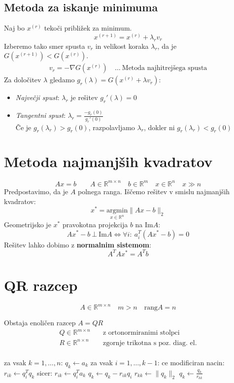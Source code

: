 \begin{multicols}{4}
\subsection{Metoda za iskanje minimuma}
Naj bo $x^{(r)}$ tekoči približek za minimum.
\[ x^{(r+1)} = x^{(r)} + \lambda_r v_r\]
Izberemo tako smer spusta $v_r$ in velikost koraka $\lambda_r$, da je $G(x^{(r+1)}) < G(x^{(r)})$.
\begin{align*}
	v_r = - \nabla G(x^{(r)}) & \ \dots \ \text{Metoda najhitrejšega spusta}
\end{align*} 
Za določitev $\lambda$ gledamo $g_r(\lambda) = G(x^{(r)} + \lambda v_r)$:
\begin{itemize}
	\item \textit{Največji spust}: $\lambda_r$ je rešitev $g_r'(\lambda) = 0$
	\item \textit{Tangentni spust}: $\lambda_r = \frac{-g_r(0)}{g_r'(0)}$ \\
	Če je $g_r(\lambda_r) > g_r(0)$, razpolavljamo $\lambda_r$, dokler ni $g_r(\lambda_r) < g_r(0)$
\end{itemize}

\section{Metoda najmanjših kvadratov}
\[ A x = b \qquad A \in \mathbb{R}^{m \times n} \quad b \in \mathbb{R}^m \quad x \in \mathbb{R}^n \quad x \gg n\]
Predpostavimo, da je $A$ polnega ranga.
Iščemo rešitev v smislu najmanjših kvadratov:
\[ x^* = \underset{x \in \mathbb{R}^n}{\mathrm{argmin}} \| Ax - b \|_2 \]
Geometrijsko je $x^*$ pravokotna projekcija $b$ na $\text{Im}A$:
\[Ax^* - b\ \bot \ \text{Im}A \iff \forall i:\ a_i^T (Ax^* - b) = 0\]
Rešitev lahko dobimo z \textbf{normalnim sistemom}:
\[ A^T A x^* = A^T b \]

\section{QR razcep}
\[ A \in \mathbb{R}^{m\times n} \quad m > n \quad \text{rang}A = n \]

Obstaja enoličen razcep $A = QR$
\begin{align*}
	Q \in \mathbb{R}^{m\times n} \quad &\text{z ortonormiranimi stolpci} \\
	R \in \mathbb{R}^{n\times n} \quad &\text{zgornje trikotna s poz. diag. el.} \\
\end{align*}

\begin{koda}
za vsak $k = 1, \dots, n$:
	$q_k \leftarrow a_k$
	za vsak $i = 1, \dots, k-1$:
		ce modificiran nacin:
			$r_{ik} \leftarrow q_i^T q_k$
		sicer:
			$r_{ik} \leftarrow q_i^T a_k$
		$q_k \leftarrow q_k - r_{ik} q_i$
	$r_{kk} \leftarrow \| q_k \|_2$
	$q_k \leftarrow \frac{q_k}{r_{kk}}$
\end{koda}


\end{multicols}
